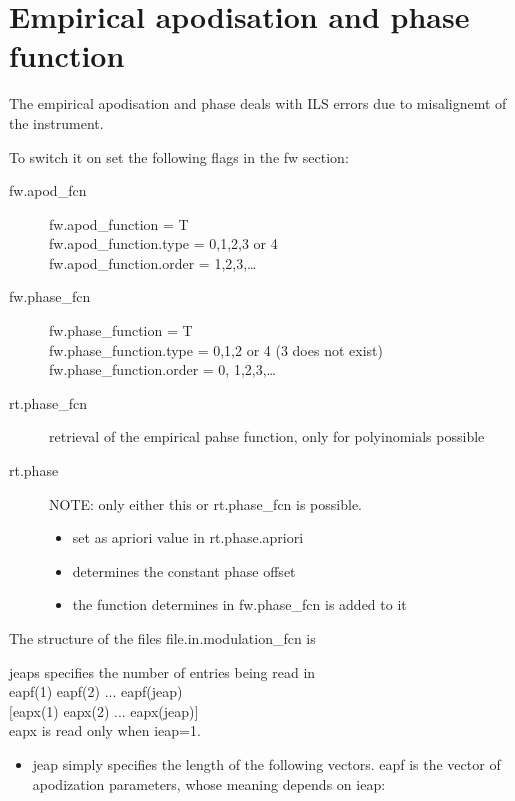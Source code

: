 \documentclass[a4paper]{article}
\begin{document}
\section{Empirical apodisation and phase function}


The empirical apodisation and phase deals with ILS errors due to
misalignemt of the instrument.

To switch it on set the following flags in the fw section:
\begin{description}
\item [fw.apod\_fcn] 
  fw.apod\_function = T\\
  fw.apod\_function.type = 0,1,2,3 or 4\\
  fw.apod\_function.order = 1,2,3,\ldots
\item [fw.phase\_fcn] 
  fw.phase\_function = T\\
  fw.phase\_function.type = 0,1,2 or 4 (3 does not exist)\\
  fw.phase\_function.order = 0, 1,2,3,\ldots\\
\item[rt.phase_fcn] retrieval of the empirical pahse function, only for polyinomials possible
\item[rt.phase] NOTE: only either this or rt.phase_fcn is possible. 
  \begin{itemize}
  \item set as apriori value in rt.phase.apriori
  \item determines the constant phase offset
  \item the function determines in fw.phase\_fcn is added to it
  \end{itemize}
\end{description}
 
The structure of the files file.in.modulation\_fcn is

\vspace{1cm}
jeaps specifies the number of entries being read in\\
eapf(1) eapf(2) ... eapf(jeap)\\
$[$eapx(1) eapx(2) ... eapx(jeap)$]$\\
\vspace{1cm}
eapx is read only when ieap=1.
\begin{itemize}
\item   jeap simply specifies the length of the following vectors. eapf is the
  vector of apodization parameters, whose meaning depends on ieap: 
\end{itemize}
\end{document}
